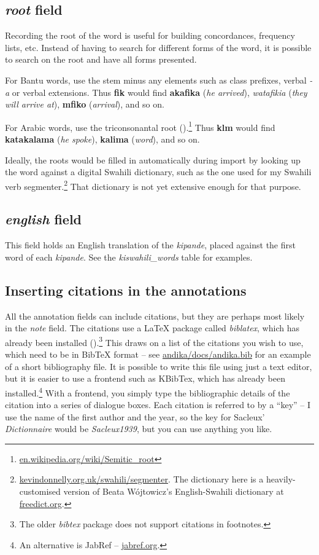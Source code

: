 \subsection{\textit{root} field}

Recording the root of the word is useful for building concordances, frequency lists, etc.  Instead of having to search for different forms of the word, it is possible to search on the root and have all forms presented.

For Bantu words, use the stem minus any elements such as class prefixes, verbal \textit{-a} or verbal extensions.  Thus \textbf{fik} would find \textbf{akafika} (\textit{he arrived}), \textit{watafikia} (\textit{they will arrive at}), \textbf{mfiko} (\textit{arrival}), and so on.

For Arabic words, use the triconsonantal root ().\footnote{\url{en.wikipedia.org/wiki/Semitic_root}}  Thus \textbf{klm} would find \textbf{katakalama} (\textit{he spoke}), \textbf{kalima} (\textit{word}), and so on.

Ideally, the roots would be filled in automatically during import by looking up the word against a digital Swahili dictionary, such as the one used for my Swahili verb segmenter.\footnote{\url{kevindonnelly.org.uk/swahili/segmenter}.  The dictionary here is a heavily-customised version of Beata Wójtowicz's English-Swahili dictionary at \url{freedict.org}.}  That dictionary is not yet extensive enough for that purpose.


\subsection{\textit{english} field}

This field holds an English translation of the \textit{kipande}, placed against the first word of each \textit{kipande}.  See the \textit{kiswahili_words} table for examples.


\subsection{Inserting citations in the annotations}

All the annotation fields can include citations, but they are perhaps most likely in the \textit{note} field.  The citations use a LaTeX package called \textit{biblatex}, which has already been installed ().\footnote{The older \textit{bibtex} package does not support citations in footnotes.}  This draws on a list of the citations you wish to use, which need to be in BibTeX format -- see \url{andika/docs/andika.bib} for an example of a short bibliography file.  It is possible to write this file using just a text editor, but it is easier to use a frontend such as KBibTex, which has already been installed.\footnote{An alternative is JabRef -- \url{jabref.org}.}  With a frontend, you simply type the bibliographic details of the citation into a series of dialogue boxes.  Each citation is referred to by a ``key'' -- I use the name of the first author and the year, so the key for Sacleux' \textit{Dictionnaire} would be \textit{Sacleux1939}, but you can use anything you like.


